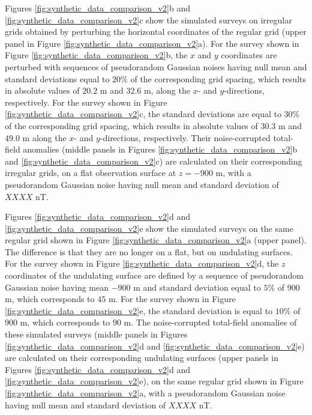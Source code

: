 Figures \ref{fig:synthetic_data_comparison_v2}b and \ref{fig:synthetic_data_comparison_v2}c 
show the simulated surveys on irregular grids obtained by perturbing the horizontal coordinates
of the regular grid (upper panel in Figure \ref{fig:synthetic_data_comparison_v2}a).
For the survey shown in Figure \ref{fig:synthetic_data_comparison_v2}b, the $x$ and $y$ coordinates 
are perturbed with sequences of pseudorandom Gaussian noises having null mean and standard deviations
equal to $20\%$ of the corresponding grid spacing, which results in
absolute values of $20.2$ m and $32.6$ m, along the $x$- and $y$-directions, respectively.
For the survey shown in Figure \ref{fig:synthetic_data_comparison_v2}c, the standard deviations
are equal to $30\%$ of the corresponding grid spacing, which results in absolute values of 
$30.3$ m and $49.0$ m along the $x$- and $y$-directions, respectively.
Their noise-corrupted total-field anomalies (middle panels in Figures 
\ref{fig:synthetic_data_comparison_v2}b and \ref{fig:synthetic_data_comparison_v2}c) are calculated 
on their corresponding irregular grids, on a flat observation surface at $z = -900$ m, 
with a pseudorandom Gaussian noise having null mean and standard deviation of $XXXX$ nT.


Figures \ref{fig:synthetic_data_comparison_v2}d and \ref{fig:synthetic_data_comparison_v2}e 
show the simulated surveys on the same regular grid shown in Figure 
\ref{fig:synthetic_data_comparison_v2}a (upper panel). The difference is that 
they are no longer on a flat, but on undulating surfaces.
For the survey shown in Figure \ref{fig:synthetic_data_comparison_v2}d, the $z$ coordinates 
of the undulating surface are defined by a sequence of pseudorandom Gaussian noise having mean 
$-900$ m and standard deviation equal to $5\%$ of $900$ m, which corresponds to $45$ m.
For the survey shown in Figure \ref{fig:synthetic_data_comparison_v2}e, the standard deviation 
is equal to $10\%$ of $900$ m, which corresponds to $90$ m.
The noise-corrupted total-field anomalies of these simulated surveys (middle panels in Figures 
\ref{fig:synthetic_data_comparison_v2}d and \ref{fig:synthetic_data_comparison_v2}e) are calculated 
on their corresponding undulating surfaces (upper panels in Figures 
\ref{fig:synthetic_data_comparison_v2}d and \ref{fig:synthetic_data_comparison_v2}e),
on the same regular grid shown in Figure \ref{fig:synthetic_data_comparison_v2}a,
with a pseudorandom Gaussian noise having null mean and standard deviation of $XXXX$ nT.


